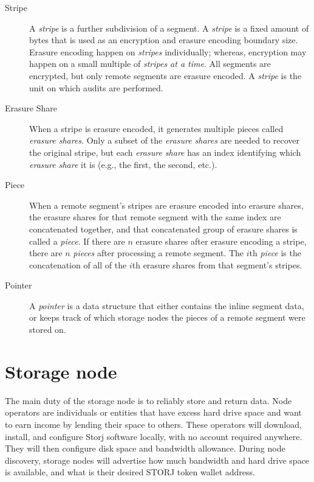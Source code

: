 \documentclass[11pt,fleqn,openany]{book}
\begin{document}
\begin{description}
\item[Stripe] A {\em stripe} is a further subdivision of a segment. A
{\em stripe} is a fixed amount of bytes that is used as an encryption and erasure
encoding boundary size. Erasure encoding happen on {\em stripes} individually;
whereas, encryption may happen on a small multiple of {\em stripes at a time}. All
segments are encrypted, but only remote segments are erasure encoded.
A {\em stripe} is the unit on which audits are performed.

\item[Erasure Share] When a stripe is erasure encoded, it generates
multiple pieces called {\em erasure shares}. Only a subset of the {\em erasure
shares} are needed to recover the original stripe, but each {\em erasure
share} has an index identifying which {\em erasure share} it is (e.g., the first,
the second, etc.).

\item[Piece] When a remote segment's stripes are erasure encoded into
erasure shares, the erasure shares for that remote segment with the
same index are concatenated together, and that concatenated group of erasure
shares is called a {\em piece}. If there are $n$ erasure shares after erasure
encoding a stripe, there are $n$ {\em pieces} after processing a remote
segment. The $i$th {\em piece} is the concatenation of all of the $i$th
erasure shares from that segment's stripes.

\item[Pointer] A {\em pointer} is a data structure that either contains the
inline segment data, or keeps track of which
storage nodes the pieces of a remote segment were stored on.
\end{description}

\section{Storage node}

The main duty of the storage node is to reliably store and return data.
Node operators
are individuals or entities that have excess hard drive space and want to earn
income by lending their space to others. These operators will
download,
install, and configure Storj software locally, with no account required
anywhere. They will then configure disk space and bandwidth allowance.
During node discovery, storage nodes will advertise how much bandwidth and
hard drive space is available, and what is their desired STORJ token
wallet address.
\end{document}
